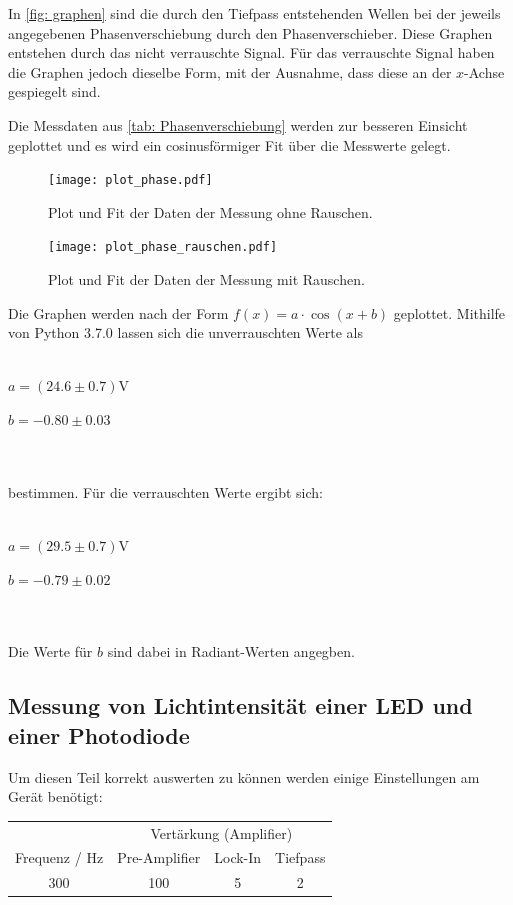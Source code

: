 In \autoref{fig: graphen} sind die durch den Tiefpass entstehenden Wellen bei der jeweils angegebenen Phasenverschiebung durch den Phasenverschieber. Diese Graphen entstehen durch das nicht verrauschte Signal.
Für das verrauschte Signal haben die Graphen jedoch dieselbe Form, mit der Ausnahme, dass diese an der $x$-Achse gespiegelt sind.

Die Messdaten aus \autoref{tab: Phasenverschiebung} werden zur besseren Einsicht geplottet und es wird ein cosinusförmiger Fit über die Messwerte gelegt.

\begin{figure}
  \centering
  \texttt{[image: plot\_phase.pdf]}
  \caption{Plot und Fit der Daten der Messung ohne Rauschen.}
  \label{fig:plot_phase}
\end{figure}

\begin{figure}
  \centering
  \texttt{[image: plot\_phase\_rauschen.pdf]}
  \caption{Plot und Fit der Daten der Messung mit Rauschen.}
  \label{fig:plot_phase_rauschen}
\end{figure}

Die Graphen werden nach der Form $f(x)=a\cdot \cos(x+b)$ geplottet. Mithilfe von Python 3.7.0 lassen sich die unverrauschten Werte als
\\ \\
\centerline{$a= (24.6 \pm 0.7)$V}
\centerline{$b= -0.80 \pm 0.03$}
\\ \\
bestimmen. Für die verrauschten Werte ergibt sich:
\\ \\
\centerline{$a= (29.5 \pm 0.7)$V}
\centerline{$b= -0.79 \pm 0.02$}
\\ \\
Die Werte für $b$ sind dabei in Radiant-Werten angegben. 

\newpage
\subsection{Messung von Lichtintensität einer LED und einer Photodiode}

Um diesen Teil korrekt auswerten zu können werden einige Einstellungen am Gerät benötigt:

\begin{table}[!htp]
  \centering
  \begin{tabular}{cccc}
    \toprule
     & \multicolumn{3}{c}{Vertärkung (Amplifier)} \\
    Frequenz / Hz & Pre-Amplifier & Lock-In & Tiefpass \\
    \midrule
    300 & 100 & 5 & 2 \\
    \bottomrule
  \end{tabular}
\end{table}

